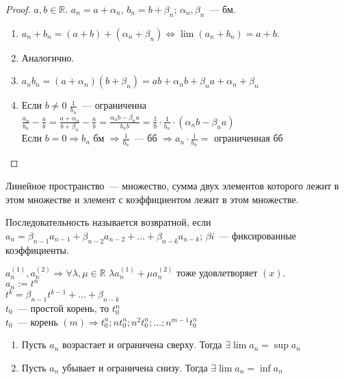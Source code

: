 \documentclass{article}
\begin{document}
	\begin{proof}
		$a, b \in \mathbb{R}$. $a_n = a + \alpha_n$, $b_n = b + \beta_n$; $\alpha_n, \beta_n$~--- бм. 
		\begin{enumerate}
			\item
			$a_n + b_n = (a + b) + (\alpha_n + \beta_n) \Leftrightarrow \lim (a_n + b_n) = a + b$.
			\item Аналогично.
			\item $a_nb_n = (a + \alpha_n)(b + \beta_n) = ab + \alpha_nb + \beta_na + \alpha_n + \beta_n$
			\item Если $b \not= 0$ $\frac{1}{b_n}$~--- ограниченна \\
			$\frac{a_n}{b_n} - \frac{a}{b} = \frac{a + \alpha_n}{b + \beta_n} - \frac{a}{b} = \frac{\alpha_nb - \beta_na}{b_nb} = \frac{1}{b} \cdot \frac{1}{b_n} \cdot (\alpha_nb - \beta_na)$ \\
			Если $b = 0 \Rightarrow b_n$ бм $\Rightarrow \frac{1}{b_n}$~--- бб $\Rightarrow a_n \cdot \frac{1}{b_n} =$ ограниченная бб
		\end{enumerate}
	\end{proof}
	\begin{definition}
		Линейное пространство~--- множество, сумма двух элементов которого лежит в этом множестве и элемент с коэффициентом лежит в этом множестве.
	\end{definition}
	\begin{definition}
		Последовательность называется возвратной, если $a_n = \beta_{n - 1} a_{n - 1} + \beta_{n - 2} a_{n - 2} + \dots + \beta_{n - k} a_{n - k}$; $\beta{i}$~--- фиксированные коэффициенты.
	\end{definition}
	\noindent
	$a_n^{(1)}, a_n^{(2)} \Rightarrow \forall \lambda, \mu \in \mathbb{R}$ $\lambda a_n^{(1)} + \mu a_n^{(2)}$ тоже удовлетворяет $(x)$. \\
	$a_n := t^n$ \\
	$t^k = \beta_{n - 1}t^{k - 1} + \dots + \beta_{n - k}$ \\
	$t_0$~--- простой корень, то $t_0^n$ \\
	$t_0$~--- корень $(m) \Rightarrow t_0^n; nt_0^n; n^2t_0^n; \dots; n^{m - 1}t_0^n$ \\
	\begin{theorem}
		\begin{enumerate}
			\item Пусть $a_n$ возрастает и ограничена сверху. Тогда $\exists \lim a_n = \sup a_n$
			\item Пусть $a_n$ убывает и ограничена снизу. Тогда $\exists \lim a_n = \inf a_n$
		\end{enumerate}
	\end{theorem}
\end{document}
